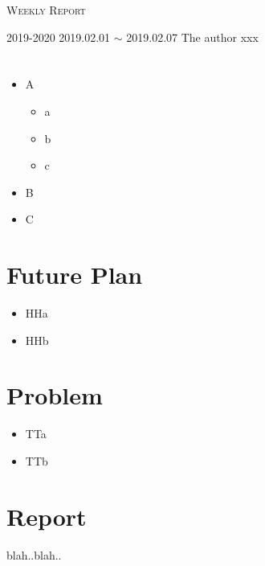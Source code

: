 \documentclass{scrartcl}
\begin{document}
\title{}
\date{}
\maketitle
\vspace{-22ex}

\begin{flushleft}
{\huge \textsc{Weekly Report}}
\vspace{4ex}

2019-2020  \hspace{1.5cm} 2019.02.01 $\sim$ 2019.02.07 \hfill The author xxx
\vspace{-3ex}
\end{flushleft}
\vspace{-4ex}

\section{}
\begin{itemize}
\item A
  \begin{itemize}
  \item a
  \item b
  \item c
  \end{itemize}
\item B
\item C
\end{itemize}
  
\section{\geo Future Plan}
\begin{itemize}
\item HHa
\item HHb
\end{itemize}
  
\section{\geo Problem}
\begin{itemize}
\item TTa
\item TTb
\end{itemize}
\section{\geo Report}
blah..blah..
\end{document}
